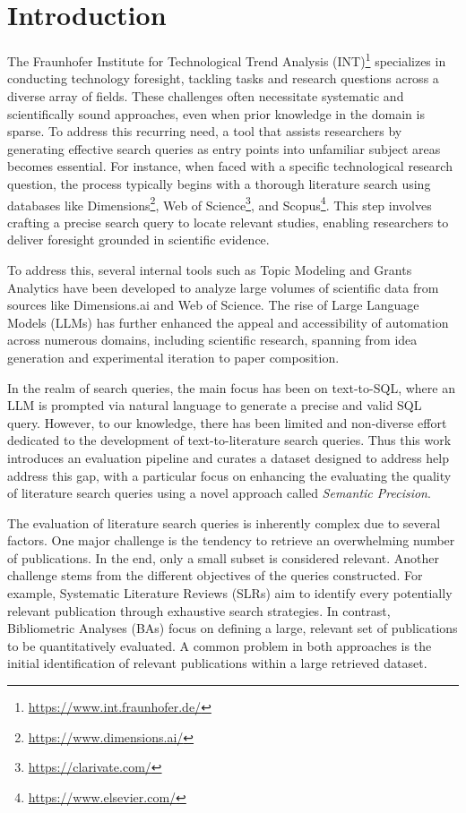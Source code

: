 \chapter{Introduction}\label{ch:intro}

The Fraunhofer Institute for Technological Trend Analysis (INT)\footnote{\url{https://www.int.fraunhofer.de/}} specializes in conducting technology foresight, tackling tasks and research questions across a diverse array of fields. These challenges often necessitate systematic and scientifically sound approaches, even when prior knowledge in the domain is sparse. To address this recurring need, a tool that assists researchers by generating effective search queries as entry points into unfamiliar subject areas becomes essential. For instance, when faced with a specific technological research question, the process typically begins with a thorough literature search using databases like Dimensions\footnote{\url{https://www.dimensions.ai/}}, Web of Science\footnote{\url{https://clarivate.com/}}, and Scopus\footnote{\url{https://www.elsevier.com/}}. This step involves crafting a precise search query to locate relevant studies, enabling researchers to deliver foresight grounded in scientific evidence.

To address this, several internal tools such as Topic Modeling and Grants Analytics have been developed to analyze large volumes of scientific data from sources like Dimensions.ai and Web of Science. The rise of Large Language Models (LLMs) has further enhanced the appeal and accessibility of automation across numerous domains, including scientific research, spanning from idea generation and experimental iteration to paper composition\autocite{lu2024aiscientistfullyautomated}.

In the realm of search queries, the main focus has been on text-to-SQL\autocite{dong2023c3}, where an LLM is prompted via natural language to generate a precise and valid SQL query. However, to our knowledge, there has been limited and non-diverse effort dedicated to the development of text-to-literature search queries. Thus this work introduces an evaluation pipeline and curates a dataset designed to address help address this gap, with a particular focus on enhancing the evaluating the quality of literature search queries using a novel approach called \textit{Semantic Precision}.

The evaluation of literature search queries is inherently complex due to several factors. One major challenge is the tendency to retrieve an overwhelming number of publications. In the end, only a small subset is considered relevant. Another challenge stems from the different objectives of the queries constructed. For example, Systematic Literature Reviews (SLRs) aim to identify every potentially relevant publication through exhaustive search strategies. In contrast, Bibliometric Analyses (BAs) focus on defining a large, relevant set of publications to be quantitatively evaluated. A common problem in both approaches is the initial identification of relevant publications within a large retrieved dataset.

